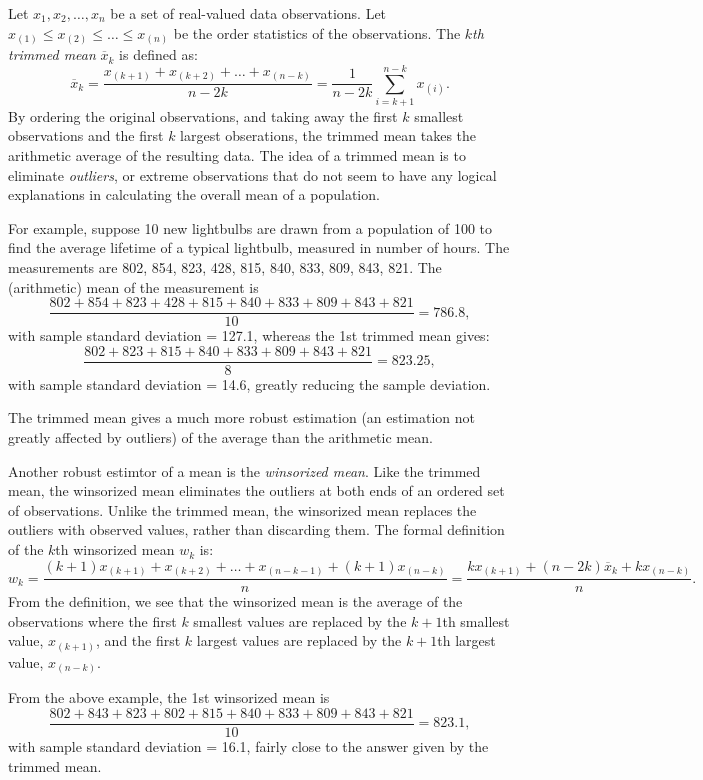 \documentclass[12pt]{article}
\begin{document}
Let $x_1,x_2,\ldots,x_n$ be a set of real-valued data observations.  Let $x_{(1)}\leq x_{(2)}\leq \ldots \leq x_{(n)}$ be the order statistics of the observations.  The $k$\emph{th trimmed mean} $\overline{x}_{k}$ is defined as:
$$\overline{x}_{k}=\frac{x_{(k+1)}+x_{(k+2)}+\ldots+x_{(n-k)}}{n-2k}=\frac{1}{n-2k}\sum_{i=k+1}^{n-k}x_{(i)}.$$
By ordering the original observations, and taking away the first $k$ smallest observations and the first $k$ largest obserations, the trimmed mean takes the arithmetic average of the resulting data.  The idea of a trimmed mean is to eliminate \emph{outliers}, or extreme observations that do not seem to have any logical explanations in calculating the overall mean of a population.
\par
For example, suppose 10 new lightbulbs are drawn from a population of 100 to find the average lifetime of a typical lightbulb, measured in number of hours.  The measurements are 802, 854, 823, 428, 815, 840, 833, 809, 843, 821.  The (arithmetic) mean of the measurement is
$$\frac{802+854+823+428+815+840+833+809+843+821}{10}=786.8,$$
with sample standard deviation = 127.1, whereas the 1st trimmed mean gives:
$$\frac{802+823+815+840+833+809+843+821}{8}=823.25,$$
with sample standard deviation = 14.6, greatly reducing the sample deviation.  
\par
The trimmed mean gives a much more robust estimation (an estimation not greatly affected by outliers) of the average than the arithmetic mean.
\par
Another robust estimtor of a mean is the \emph{winsorized mean}.  Like the trimmed mean, the winsorized mean eliminates the outliers at both ends of an ordered set of observations.  Unlike the trimmed mean, the winsorized mean replaces the outliers with observed values, rather than discarding them.  The formal definition of the $k$th winsorized mean $w_k$ is:
$$w_k=\frac{(k+1)x_{(k+1)}+x_{(k+2)}+\ldots+x_{(n-k-1)}+(k+1)x_{(n-k)}}{n}=\frac{kx_{(k+1)}+(n-2k)\overline{x}_{k}+kx_{(n-k)}}{n}.$$
From the definition, we see that the winsorized mean is the average of the observations where the first $k$ smallest values are replaced by the $k+1$th smallest  value, $x_{(k+1)}$, and the first $k$ largest values are replaced by the $k+1$th largest value, $x_{(n-k)}$.
\par
From the above example, the 1st winsorized mean is
$$\frac{802+843+823+802+815+840+833+809+843+821}{10}=823.1,$$
with sample standard deviation = 16.1, fairly close to the answer given by the trimmed mean.
\end{document}
